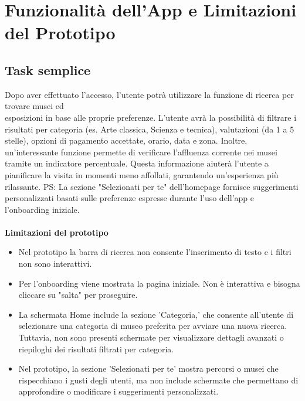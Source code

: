 \documentclass{article}
\begin{document}
\section{Funzionalità dell'App e Limitazioni del Prototipo}
\subsection{Task semplice}
Dopo aver effettuato l'accesso, l'utente potrà utilizzare la funzione di ricerca per trovare musei ed \\ esposizioni in base alle proprie preferenze. L'utente avrà la possibilità di filtrare i risultati per categoria (es. Arte classica, Scienza e tecnica), valutazioni (da 1 a 5 stelle), opzioni di pagamento accettate, orario, data e zona. Inoltre, un'interessante funzione permette di verificare l'affluenza corrente nei musei tramite un indicatore percentuale. Questa informazione aiuterà l'utente a pianificare la visita in momenti meno affollati, garantendo un'esperienza più rilassante.
PS: La sezione "Selezionati per te" dell’homepage fornisce suggerimenti personalizzati basati sulle preferenze espresse durante l'uso dell'app e l’onboarding iniziale. \\
\\
\textbf{Limitazioni del prototipo}
\begin{itemize}
\item Nel prototipo la barra di ricerca non consente l'inserimento di testo e i filtri non sono interattivi.
\item Per l'onboarding viene mostrata la pagina iniziale. Non è interattiva e bisogna cliccare su "salta" per proseguire.
\item La schermata Home include la sezione 'Categoria,' che consente all’utente di selezionare una categoria di museo preferita per avviare una nuova ricerca. Tuttavia, non sono presenti schermate per visualizzare dettagli avanzati o riepiloghi dei risultati filtrati per categoria.
\item Nel prototipo, la sezione 'Selezionati per te' mostra percorsi o musei che rispecchiano i gusti degli utenti, ma non include schermate che permettano di approfondire o modificare i suggerimenti personalizzati.
\end{itemize}
\end{document}
